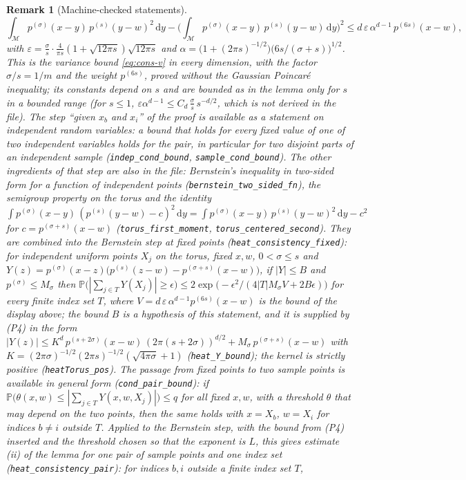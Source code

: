 \documentclass[11pt,a4paper]{article}
\theoremstyle{stmt}
\theoremstyle{defn}
\theoremstyle{rmk}
\newtheorem{remark}[theorem]{Remark}
\numberwithin{equation}{section}
\newcommand{\M}{\mathcal{M}}
\newcommand{\dd}{\mathrm{d}}
\begin{document}
{\begin{remark}[Machine-checked statements]
\[
\int_{\M}p^{(\sigma)}(x-y)\,p^{(s)}(y-w)^2\,\dd y-\Big(\int_{\M}p^{(\sigma)}(x-y)\,p^{(s)}(y-w)\,\dd y\Big)^2\le d\,\varepsilon\,\alpha^{d-1}\,p^{(6s)}(x-w),
\]
with $\varepsilon=\frac\sigma s\cdot\frac4{\pi s}(1+\sqrt{12\pi s})\sqrt{12\pi s}$ and $\alpha=\big(1+(2\pi s)^{-1/2}\big)\big(6s/(\sigma+s)\big)^{1/2}$. This is the variance bound \eqref{eq:cons-v} in every dimension, with the factor $\sigma/s=1/m$ and the weight $p^{(6s)}$, proved without the Gaussian Poincar\'e inequality; its constants depend on $s$ and are bounded as in the lemma only for $s$ in a bounded range (for $s\le1$, $\varepsilon\alpha^{d-1}\le C_d\,\frac\sigma s\,s^{-d/2}$, which is not derived in the file). The step ``given $x_b$ and $x_i$'' of the proof is available as a statement on independent random variables: a bound that holds for every fixed value of one of two independent variables holds for the pair, in particular for two disjoint parts of an independent sample (\texttt{indep\_cond\_bound}, \texttt{sample\_cond\_bound}). The other ingredients of that step are also in the file: Bernstein's inequality in two-sided form for a function of independent points (\texttt{bernstein\_two\_sided\_fn}), the semigroup property on the torus and the identity $\int p^{(\sigma)}(x-y)\,(p^{(s)}(y-w)-c)^2\,\dd y=\int p^{(\sigma)}(x-y)\,p^{(s)}(y-w)^2\,\dd y-c^2$ for $c=p^{(\sigma+s)}(x-w)$ (\texttt{torus\_first\_moment}, \texttt{torus\_centered\_second}). They are combined into the Bernstein step at fixed points (\texttt{heat\_consistency\_fixed}): for independent uniform points $X_j$ on the torus, fixed $x,w$, $0<\sigma\le s$ and $Y(z)=p^{(\sigma)}(x-z)\big(p^{(s)}(z-w)-p^{(\sigma+s)}(x-w)\big)$, if $|Y|\le B$ and $p^{(\sigma)}\le M_\sigma$ then $\mathbb P\big(|\sum_{j\in T}Y(X_j)|\ge\epsilon\big)\le2\exp\big(-\epsilon^2/(4|T|M_\sigma V+2B\epsilon)\big)$ for every finite index set $T$, where $V=d\,\varepsilon\,\alpha^{d-1}p^{(6s)}(x-w)$ is the bound of the display above; the bound $B$ is a hypothesis of this statement, and it is supplied by (P4) in the form $|Y(z)|\le K^d\,p^{(s+2\sigma)}(x-w)\,(2\pi(s+2\sigma))^{d/2}+M_\sigma\,p^{(\sigma+s)}(x-w)$ with $K=(2\pi\sigma)^{-1/2}(2\pi s)^{-1/2}(\sqrt{4\pi\sigma}+1)$ (\texttt{heat\_Y\_bound}); the kernel is strictly positive (\texttt{heatTorus\_pos}). The passage from fixed points to two sample points is available in general form (\texttt{cond\_pair\_bound}): if $\mathbb P\big(\theta(x,w)\le|\sum_{j\in T}Y(x,w,X_j)|\big)\le q$ for all fixed $x,w$, with a threshold $\theta$ that may depend on the two points, then the same holds with $x=X_b$, $w=X_i$ for indices $b\ne i$ outside $T$. Applied to the Bernstein step, with the bound from (P4) inserted and the threshold chosen so that the exponent is $L$, this gives estimate (ii) of the lemma for one pair of sample points and one index set (\texttt{heat\_consistency\_pair}): for indices $b,i$ outside a finite index set $T$,

\end{remark}}
\end{document}
